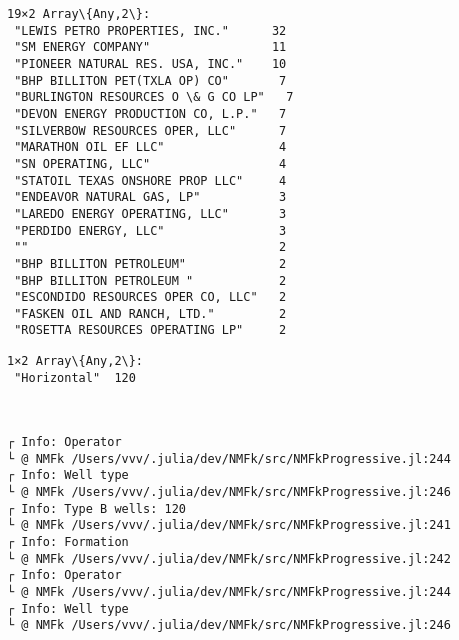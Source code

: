 \documentclass[11pt]{article}
\begin{document}
    
    
    \begin{Verbatim}[commandchars=\\\{\}]
19×2 Array\{Any,2\}:
 "LEWIS PETRO PROPERTIES, INC."      32
 "SM ENERGY COMPANY"                 11
 "PIONEER NATURAL RES. USA, INC."    10
 "BHP BILLITON PET(TXLA OP) CO"       7
 "BURLINGTON RESOURCES O \& G CO LP"   7
 "DEVON ENERGY PRODUCTION CO, L.P."   7
 "SILVERBOW RESOURCES OPER, LLC"      7
 "MARATHON OIL EF LLC"                4
 "SN OPERATING, LLC"                  4
 "STATOIL TEXAS ONSHORE PROP LLC"     4
 "ENDEAVOR NATURAL GAS, LP"           3
 "LAREDO ENERGY OPERATING, LLC"       3
 "PERDIDO ENERGY, LLC"                3
 ""                                   2
 "BHP BILLITON PETROLEUM"             2
 "BHP BILLITON PETROLEUM "            2
 "ESCONDIDO RESOURCES OPER CO, LLC"   2
 "FASKEN OIL AND RANCH, LTD."         2
 "ROSETTA RESOURCES OPERATING LP"     2
    \end{Verbatim}

    
    
    \begin{Verbatim}[commandchars=\\\{\}]
1×2 Array\{Any,2\}:
 "Horizontal"  120
    \end{Verbatim}

    
    \begin{center}
    \end{center}
    { \hspace*{\fill} \\}
    
    \begin{Verbatim}[commandchars=\\\{\}]
┌ Info: Operator
└ @ NMFk /Users/vvv/.julia/dev/NMFk/src/NMFkProgressive.jl:244
┌ Info: Well type
└ @ NMFk /Users/vvv/.julia/dev/NMFk/src/NMFkProgressive.jl:246
┌ Info: Type B wells: 120
└ @ NMFk /Users/vvv/.julia/dev/NMFk/src/NMFkProgressive.jl:241
┌ Info: Formation
└ @ NMFk /Users/vvv/.julia/dev/NMFk/src/NMFkProgressive.jl:242
┌ Info: Operator
└ @ NMFk /Users/vvv/.julia/dev/NMFk/src/NMFkProgressive.jl:244
┌ Info: Well type
└ @ NMFk /Users/vvv/.julia/dev/NMFk/src/NMFkProgressive.jl:246
    \end{Verbatim}

    \begin{center}
    \end{center}
    { \hspace*{\fill} \\}
    
\end{document}
